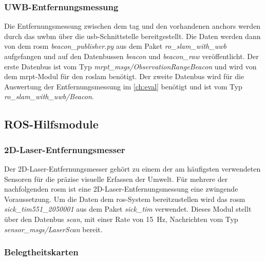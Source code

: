 %
%
%
\subsubsection{UWB-Entfernungsmessung}

Die Entfernungsmessung zwischen dem \Gls{tag} und den vorhandenen \Glspl{anchor} werden durch das \Gls{uwbm} über die \Gls{usb}-Schnittstelle bereitgestellt. Die Daten werden dann von dem \Gls{rosm} \textit{beacon\_publisher.py} aus dem Paket \textit{ro\_slam\_with\_uwb} aufgefangen und auf den Datenbussen \textit{beacon} und \textit{beacon\_raw} veröffentlicht. Der erste Datenbus ist vom Typ \textit{mrpt\_msgs/ObservationRangeBeacon} und wird von dem \Gls{mrpt}-Modul für den \Gls{roslam} benötigt. Der zweite Datenbus wird für die Auswertung der Entfernungsmessung im \autoref{ch:eval} benötigt und ist vom Typ \textit{ro\_slam\_with\_uwb/Beacon}.


%
%
%
\subsection{ROS-Hilfsmodule}


%
%
\subsubsection{2D-Laser-Entfernungsmesser}

Der 2D-Laser-Entfernungsmesser gehört zu einem der am häufigsten verwendeten Sensoren für die präzise visuelle Erfassen der Umwelt. Für mehrere der nachfolgenden \Gls{rosm} ist eine 2D-Laser-Entfernungsmessung eine zwingende Voraussetzung. Um die Daten dem \Gls{ros}-System bereitzustellen wird das \Gls{rosm} \textit{sick\_tim551\_2050001} aus dem Paket \textit{sick\_tim} verwendet. Dieses Modul stellt über den Datenbus \textit{scan}, mit einer Rate von \SI{15}{\hertz}, Nachrichten vom Typ \textit{sensor\_msgs/LaserScan} bereit.


%
%
\subsubsection{Belegtheitskarten}

